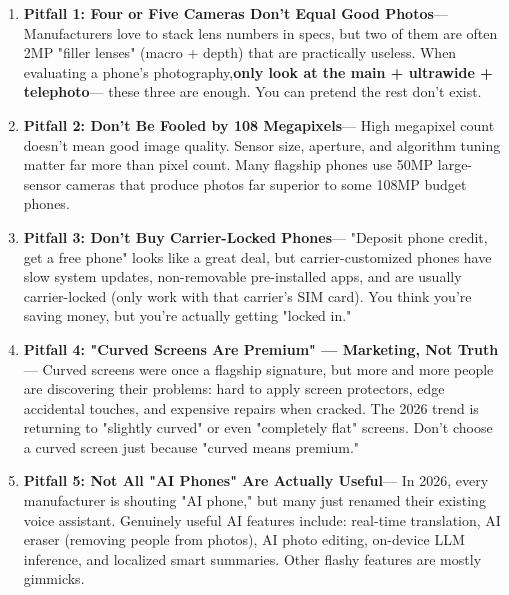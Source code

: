 
\begin{enumerate}
  \item \textbf{Pitfall 1: Four or Five Cameras Don't Equal Good Photos}— Manufacturers love to stack lens numbers in specs, but two of them are often 2MP "filler lenses" (macro + depth) that are practically useless. When evaluating a phone's photography,\textbf{only look at the main + ultrawide + telephoto}— these three are enough. You can pretend the rest don't exist.
  \item \textbf{Pitfall 2: Don't Be Fooled by 108 Megapixels}— High megapixel count doesn't mean good image quality. Sensor size, aperture, and algorithm tuning matter far more than pixel count. Many flagship phones use 50MP large-sensor cameras that produce photos far superior to some 108MP budget phones.
  \item \textbf{Pitfall 3: Don't Buy Carrier-Locked Phones}— "Deposit phone credit, get a free phone" looks like a great deal, but carrier-customized phones have slow system updates, non-removable pre-installed apps, and are usually carrier-locked (only work with that carrier's SIM card). You think you're saving money, but you're actually getting "locked in."
  \item \textbf{Pitfall 4: "Curved Screens Are Premium" — Marketing, Not Truth}— Curved screens were once a flagship signature, but more and more people are discovering their problems: hard to apply screen protectors, edge accidental touches, and expensive repairs when cracked. The 2026 trend is returning to "slightly curved" or even "completely flat" screens. Don't choose a curved screen just because "curved means premium."
  \item \textbf{Pitfall 5: Not All "AI Phones" Are Actually Useful}— In 2026, every manufacturer is shouting "AI phone," but many just renamed their existing voice assistant. Genuinely useful AI features include: real-time translation, AI eraser (removing people from photos), AI photo editing, on-device LLM inference, and localized smart summaries. Other flashy features are mostly gimmicks.
\end{enumerate}



